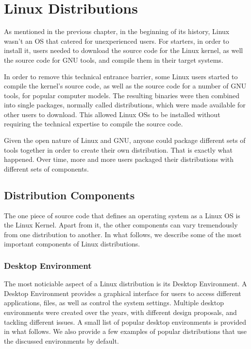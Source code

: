 \chapter{Linux Distributions}\label{ch:distributions}

As mentioned in the previous chapter, in the beginning of its history, Linux wasn't an \acs{OS} that catered for unexperienced users. For starters, in order to install it, users needed to download the source code for the Linux kernel, as well the source code for \acs{GNU} tools, and compile them in their target systems.

In order to remove this technical entrance barrier, some Linux users started to compile the kernel's source code, as well as the source code for a number of \acs{GNU} tools, for popular computer models. The resulting binaries were then combined into single packages, normally called distributions, which were made available for other users to download. This allowed Linux \acs{OS}s to be installed without requiring the technical expertise to compile the source code.

Given the open nature of Linux and GNU, anyone could package different sets of tools together in order to create their own distribution. That is exactly what happened. Over time, more and more users packaged their distributions with different sets of components.

\section{Distribution Components}

The one piece of source code that defines an operating system as a Linux \acs{OS} is the Linux Kernel. Apart from it, the other components can vary tremendously from one distribution to another. In what follows, we describe some of the most important components of Linux distributions.

\subsection{Desktop Environment}

The most noticiable aspect of a Linux distribution is its Desktop Environment. A Desktop Environment provides a graphical interface for users to access different applications, files, as well as control the system settings. Multiple desktop environments were created over the years, with different design proposals, and tackling different issues. A small list of popular desktop environments is provided in what follows. We also provide a few examples of popular distributions that use the discussed environments by default.

